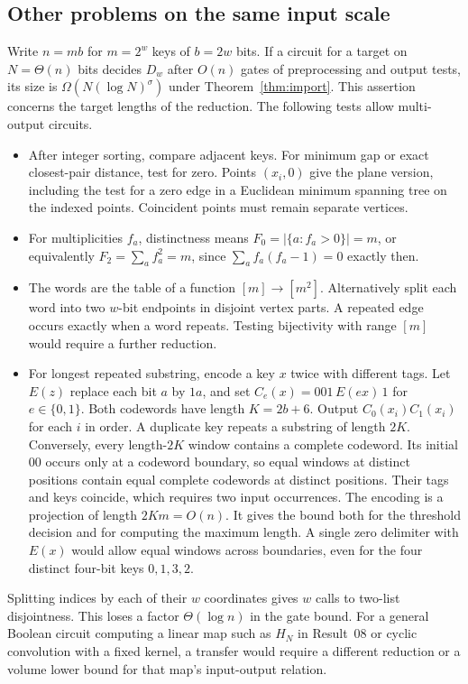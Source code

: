 \documentclass[11pt]{article}
\theoremstyle{definition}
\theoremstyle{remark}
\begin{document}
\subsection{Other problems on the same input scale}\label{sec:transfers}
Write $n=mb$ for $m=2^w$ keys of $b=2w$ bits. If a circuit for a target
on $N=\Theta(n)$ bits decides $D_w$ after $O(n)$ gates of preprocessing
and output tests, its size is $\Omega(N(\log N)^\sigma)$ under
Theorem~\ref{thm:import}. This assertion concerns the target lengths
of the reduction. The following tests allow multi-output circuits.
\begin{itemize}
\item After integer sorting, compare adjacent keys. For minimum gap or
exact closest-pair distance, test for zero. Points $(x_i,0)$ give the
plane version, including the test for a zero edge in a Euclidean
minimum spanning tree on the indexed points. Coincident points must
remain separate vertices.
\item For multiplicities $f_a$, distinctness means
$F_0=|\{a:f_a>0\}|=m$, or equivalently $F_2=\sum_a f_a^2=m$,
since $\sum_a f_a(f_a-1)=0$ exactly then.
\item The words are the table of a function $[m]\to[m^2]$.
Alternatively split each word into two $w$-bit endpoints in disjoint
vertex parts. A repeated edge occurs exactly when a word repeats.
Testing bijectivity with range $[m]$ would require a further reduction.
\item For longest repeated substring, encode a key $x$ twice with
different tags. Let $E(z)$ replace each bit $a$ by $1a$, and set
$C_e(x)=001\,E(ex)\,1$ for $e\in\{0,1\}$. Both codewords have
length $K=2b+6$. Output $C_0(x_i)C_1(x_i)$ for each $i$ in order.
A duplicate key repeats a substring of length $2K$. Conversely, every
length-$2K$ window contains a complete codeword. Its initial $00$
occurs only at a codeword boundary, so equal windows at distinct
positions contain equal complete codewords at distinct positions.
Their tags and keys coincide, which requires two input occurrences.
The encoding is a projection of length $2Km=O(n)$. It gives the bound
both for the threshold decision and for computing the maximum length.
A single zero delimiter with $E(x)$ would allow equal windows across
boundaries, even for the four distinct four-bit keys $0,1,3,2$.
\end{itemize}
Splitting indices by each of their $w$ coordinates gives $w$ calls
to two-list disjointness. This loses a factor $\Theta(\log n)$ in the
gate bound. For a general Boolean circuit computing a linear map such
as $H_N$ in Result~08 or cyclic convolution with a fixed kernel, a
transfer would require a different reduction or a volume lower bound
for that map's input-output relation.
\end{document}
